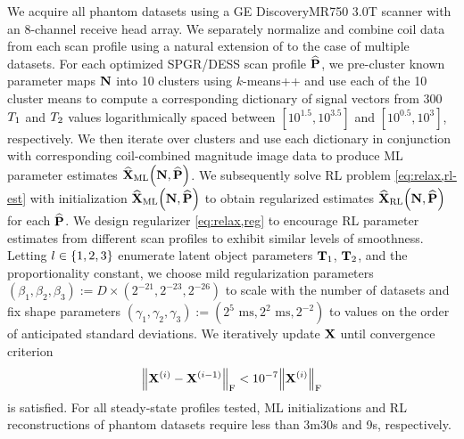 We acquire all phantom datasets 
using a GE Discovery\tmark MR750 3.0T scanner 
with an 8-channel receive head array. 
We separately normalize and combine coil data 
from each scan profile using a natural extension 
of \cite{ying:07:jir} to the case of multiple datasets. 
For each optimized SPGR/DESS scan profile $\widehat{\mathbf{P}}$, 
we pre-cluster known parameter maps $\mathbf{N}$ 
into 10 clusters using $k$-means++ \cite{arthur:07:kmt} 
and use each of the 10 cluster means 
to compute a corresponding dictionary 
of signal vectors from 300 $T_1$ and $T_2$ values 
logarithmically spaced between $[10^{1.5}, 10^{3.5}]$ 
and $[10^{0.5}, 10^3]$, respectively.
We then iterate over clusters 
and use each dictionary in conjunction 
with corresponding coil-combined magnitude image data 
to produce ML parameter estimates 
$\estaML{\bmX}{\bmN,\bmPs}$.
We subsequently solve RL problem \eqref{eq:relax,rl-est} 
with initialization $\estaML{\bmX}{\bmN,\bmPs}$ 
to obtain regularized estimates $\estaRL{\bmX}{\bmN,\bmPs}$ 
for each $\widehat{\mathbf{P}}$. 
We design regularizer \eqref{eq:relax,reg} 
to encourage RL parameter estimates 
from different scan profiles 
to exhibit similar levels of smoothness.
Letting $l \in \set{1, 2, 3}$ enumerate latent object parameters 
$\mathbf{T}_1$, $\mathbf{T}_2$, and the proportionality constant, 
we choose mild regularization parameters 
$(\beta_1, \beta_2, \beta_3) := D \times (2^{-21}, 2^{-23}, 2^{-26})$ 
to scale with the number of datasets
and fix shape parameters
$(\gamma_1, \gamma_2, \gamma_3) := (2^{5} \textrm{ ms}, 2^{2} \textrm{ ms}, 2^{-2})$ 
to values on the order 
of anticipated standard deviations.
We iteratively update $\mathbf{X}$ until convergence criterion 
\begin{align}
	\frob{\iter{\bmX}{i}-\iter{\bmX}{i-1}} < 10^{-7} \frob{\iter{\bmX}{i}}
	\label{eq:conv,crit}
\end{align}
is satisfied. 
For all steady-state profiles tested, 
ML initializations and RL reconstructions 
of phantom datasets require less than
3m30s and 9s, respectively.

